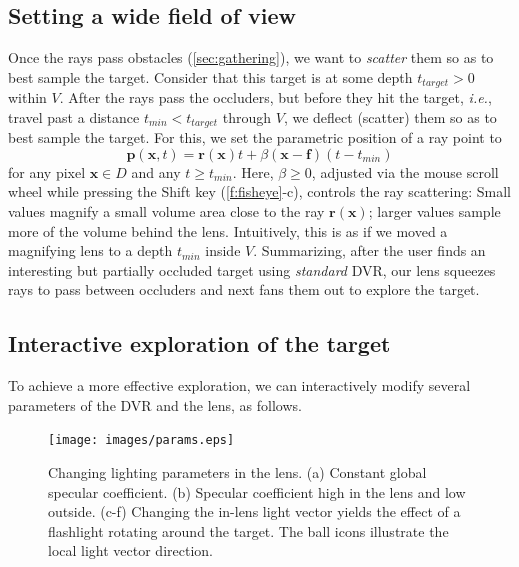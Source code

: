\subsection{Setting a wide field of view}
\label{sec:scattering}
%
Once the rays pass obstacles (\autoref{sec:gathering}), we want to \emph{scatter} them so as to best sample the target. Consider that this target is at some depth $t_{target}>0$ within $V$. After the rays pass the occluders, but before they hit the target, \emph{i.e.}, travel past a distance $t_{min} < t_{target}$ through $V$, we deflect (scatter) them so as to best sample the target. For this, we set the parametric position of a ray point to
%
\begin{equation}
\mathbf{p}(\mathbf{x}, t) = \mathbf{r}(\mathbf{x})t + \beta (\mathbf{x}-\mathbf{f})(t-t_{min})
\label{eqn:scattering}
\end{equation}
%
for any pixel $\mathbf{x} \in D$ and any $t \geq t_{min}$. Here, $\beta \geq 0$, adjusted via the mouse scroll wheel while pressing the Shift key (\autoref{f:fisheye}-c), controls the ray scattering: Small values magnify a small volume area close to the ray $\mathbf{r}(\mathbf{x})$; larger values sample more of the volume behind the lens. Intuitively, this is as if we moved a magnifying lens to a depth $t_{min}$ inside $V$. Summarizing, after the user finds an interesting but partially occluded target using \emph{standard} DVR, our lens squeezes rays to pass between occluders and next fans them out to explore the target.
%
%


\subsection{Interactive exploration of the target}
\label{sec:inter_expl}
%
To achieve a more effective exploration, we can interactively modify several parameters of the DVR and the lens, as follows.
%
\begin{figure}
\centering

\texttt{[image: images/params.eps]}

\caption{Changing lighting parameters in the lens. (a) Constant global specular coefficient. (b) Specular coefficient high in the lens and low outside. (c-f) Changing the in-lens light vector yields the effect of a flashlight rotating around the target. The ball icons illustrate the local light vector direction.}
\label{f:params}

\end{figure}
%



